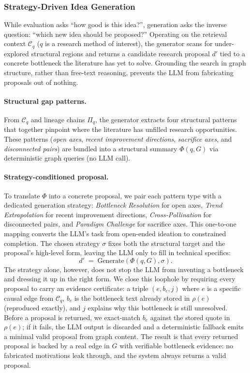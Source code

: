 \documentclass{opendatalab}
\begin{document}
\subsubsection{Strategy-Driven Idea Generation}
\label{sec:gen}

While evaluation asks ``how good is this idea?'', generation asks the inverse question: ``which new idea should be proposed?'' Operating on the retrieval context $\mathcal{C}_q$ ($q$ is a research method of interest), the generator scans for under-explored structural regions and returns a candidate research proposal $d'$ tied to a concrete bottleneck the literature has yet to solve. Grounding the search in graph structure, rather than free-text reasoning, prevents the LLM from fabricating proposals out of nothing.

\paragraph{Structural gap patterns.}
From $\mathcal{C}_q$ and lineage chains $\Pi_q$, the generator extracts four structural patterns that together pinpoint where the literature has unfilled research opportunities. These patterns (\textit{open axes}, \textit{recent improvement directions}, \textit{sacrifice axes}, and \textit{disconnected pairs}) are bundled into a structural summary $\Phi(q, G)$ via deterministic graph queries (no LLM call).

\paragraph{Strategy-conditioned proposal.}
To translate $\Phi$ into a concrete proposal, we pair each pattern type with a dedicated generation strategy: \textit{Bottleneck Resolution} for open axes, \textit{Trend Extrapolation} for recent improvement directions, \textit{Cross-Pollination} for disconnected pairs, and \textit{Paradigm Challenge} for sacrifice axes. This one-to-one mapping converts the LLM's task from open-ended ideation to constrained completion. The chosen strategy $\sigma$ fixes both the structural target and the proposal's high-level form, leaving the LLM only to fill in technical specifics:
\begin{equation}
d' \;=\; \mathrm{Generate}(\Phi(q, G), \sigma).
\label{eq:gen}
\end{equation}
The strategy alone, however, does not stop the LLM from inventing a bottleneck and dressing it up in the right form. We close this loophole by requiring every proposal to carry an evidence certificate: a triple $(e, b_e, j)$ where $e$ is a specific causal edge from $\mathcal{C}_q$, $b_e$ is the bottleneck text already stored in $\rho(e)$ (reproduced exactly), and $j$ explains why this bottleneck is still unresolved. Before a proposal is returned, we exact-match $b_e$ against the stored quote in $\rho(e)$; if it fails, the LLM output is discarded and a deterministic fallback emits a minimal valid proposal from graph content. The result is that every returned proposal is backed by a real edge in $G$ with verifiable bottleneck evidence: no fabricated motivations leak through, and the system always returns a valid proposal.
\end{document}
